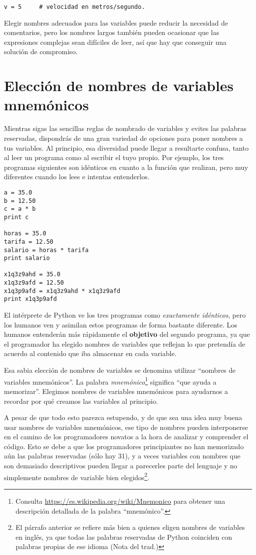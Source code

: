 \beforeverb
\begin{verbatim}
v = 5     # velocidad en metros/segundo. 
\end{verbatim}
\afterverb
%
Elegir nombres adecuados para las variables puede reducir la necesidad de comentarios, pero
los nombres largos también pueden ocasionar que las expresiones complejas sean difíciles de leer, así
que hay que conseguir una solución de compromiso.

\section{Elección de nombres de variables mnemónicos}


Mientras sigas las sencillas reglas de nombrado de variables y evites las
palabras reservadas, dispondrás de una gran variedad de opciones para poner nombres a tus variables.
Al principio, esa diversidad puede llegar a resultarte confusa, tanto al leer un programa
como al escribir el tuyo propio. Por ejemplo, los tres
programas siguientes son idénticos en cuanto a la función que realizan,
pero muy diferentes cuando los lees e intentas entenderlos.

\beforeverb
\begin{verbatim}
a = 35.0
b = 12.50
c = a * b
print c

horas = 35.0
tarifa = 12.50
salario = horas * tarifa
print salario

x1q3z9ahd = 35.0
x1q3z9afd = 12.50
x1q3p9afd = x1q3z9ahd * x1q3z9afd
print x1q3p9afd
\end{verbatim}
\afterverb
%
El intérprete de Python ve los tres programas como \emph{exactamente idénticos},
pero los humanos ven y asimilan estos programas de forma bastante diferente.
Los humanos entenderán más rápidamente el {\bf objetivo}
del segundo programa, ya que el programador
ha elegido nombres de variables que reflejan lo que pretendía
de acuerdo al contenido que iba almacenar en cada variable.

Esa sabia elección de nombres de variables se denomina utilizar ``nombres de variables mnemónicos''.
La palabra \emph{mnemónico}\footnote{Consulta
\url{https://es.wikipedia.org/wiki/Mnemonico}
para obtener una descripción detallada de la palabra ``mnemónico''.}
significa ``que ayuda a memorizar''.
Elegimos nombres de variables mnemónicos para ayudarnos a recordar por qué creamos las variables
al principio.

A pesar de que todo esto parezca estupendo, y de que sea una idea muy buena usar nombres
de variables mnemónicos, ese tipo de nombres pueden interponerse en el camino de los programadores
novatos a la hora de analizar y comprender el código. Esto se debe a que los programadores
principiantes no han memorizado aún las palabras reservadas (sólo hay 31), y a veces
variables con nombres que son demasiado descriptivos pueden llegar a parecerles
parte del lenguaje y no simplemente nombres de variable bien elegidos\footnote{El párrafo anterior
se refiere más bien a quienes eligen nombres de variables en inglés, ya que todas las
palabras reservadas de Python coinciden con palabras propias de ese idioma (Nota del trad.)}.

